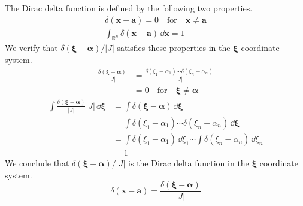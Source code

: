 {\begin{Solution}
  \label{solution ode dirac nd jacobian}
  The Dirac delta function is defined by the following two properties.
  \begin{gather*}
    \delta(\mathbf{x} - \mathbf{a}) = 0 
    \quad \mathrm{for} \quad \mathbf{x} \neq \mathbf{a}
    \\
    \int_{\mathbb{R}^n} \delta(\mathbf{x} - \mathbf{a}) \,\dd \mathbf{x} = 1
  \end{gather*}
  We verify that $\delta(\boldsymbol{\xi} - \boldsymbol{\alpha}) / |J|$ satisfies these properties
  in the $\boldsymbol{\xi}$ coordinate system.
  \begin{align*}
    \frac{ \delta(\boldsymbol{\xi} - \boldsymbol{\alpha}) }{ |J| }
    &= \frac{ \delta(\xi_1 - \alpha_1) \cdots \delta(\xi_n - \alpha_n) }{ |J| }
    \\
    &= 0 \quad \mathrm{for} \quad \boldsymbol{\xi} \neq \boldsymbol{\alpha}
  \end{align*}
  \begin{align*}
    \int \frac{ \delta(\boldsymbol{\xi} - \boldsymbol{\alpha}) }{ |J| }|J|\,\dd \boldsymbol{\xi}
    &= \int \delta(\boldsymbol{\xi} - \boldsymbol{\alpha}) \,\dd \boldsymbol{\xi}
    \\
    &= \int \delta(\xi_1 - \alpha_1) \cdots \delta(\xi_n - \alpha_n) \,\dd \boldsymbol{\xi}
    \\
    &= \int \delta(\xi_1 - \alpha_1)\,\dd \xi_1 \cdots \int \delta(\xi_n - \alpha_n)\,\dd \xi_n
    \\
    &= 1
  \end{align*}
  We conclude that $\delta(\boldsymbol{\xi} - \boldsymbol{\alpha}) / |J|$ is the Dirac delta function
  in the $\boldsymbol{\xi}$ coordinate system.
  \[
  \delta(\mathbf{x} - \mathbf{a}) = \frac{ \delta(\boldsymbol{\xi} - \boldsymbol{\alpha}) }{ |J| }
  \]
\end{Solution}






}
